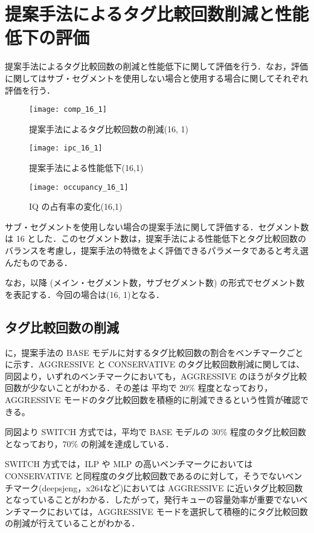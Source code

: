\section{提案手法によるタグ比較回数削減と性能低下の評価}
提案手法によるタグ比較回数の削減と性能低下に関して評価を行う．なお，評価に関してはサブ・セグメントを使用しない場合と使用する場合に関してそれぞれ評価を行う．

\begin{figure}[htb]
  \centering
  \texttt{[image: comp\_16\_1]}
  \caption{提案手法によるタグ比較回数の削減(16, 1)}
  \label{fig:comp_16_1}
\end{figure}
\begin{figure}[htb]
  \centering
  \texttt{[image: ipc\_16\_1]}
  \caption{提案手法による性能低下(16,1)}
  \label{fig:ipc_16_1}
\end{figure}
\begin{figure}[htb]
  \centering
  \texttt{[image: occupancy\_16\_1]}
  \caption{IQ の占有率の変化(16,1)}
  \label{fig:occupancy_16_1}
\end{figure}

サブ・セグメントを使用しない場合の提案手法に関して評価する．セグメント数は 16 とした．このセグメント数は，提案手法による性能低下とタグ比較回数のバランスを考慮し，提案手法の特徴をよく評価できるパラメータであると考え選んだものである．

なお，以降 (メイン・セグメント数，サブセグメント数) の形式でセグメント数を表記する．今回の場合は(16, 1)となる．

\subsection{タグ比較回数の削減}
に，提案手法の BASE モデルに対するタグ比較回数の割合をベンチマークごとに示す．AGGRESSIVE と CONSERVATIVE のタグ比較回数削減に関しては、同図より，いずれのベンチマークにおいても，AGGRESSIVE のほうがタグ比較回数が少ないことがわかる．その差は 平均で 20\% 程度となっており，AGGRESSIVE モードのタグ比較回数を積極的に削減できるという性質が確認できる。

同図より SWITCH 方式では，平均で BASE モデルの 30\% 程度のタグ比較回数となっており，70\% の削減を達成している．

SWITCH 方式では，ILP や MLP の高いベンチマークにおいてはCONSERVATIVE と同程度のタグ比較回数であるのに対して，そうでないベンチマーク(deepsjeng，x264など)においては AGGRESSIVE に近いタグ比較回数となっていることがわかる．したがって，発行キューの容量効率が重要でないベンチマークにおいては，AGGRESSIVE モードを選択して積極的にタグ比較回数の削減が行えていることがわかる．

